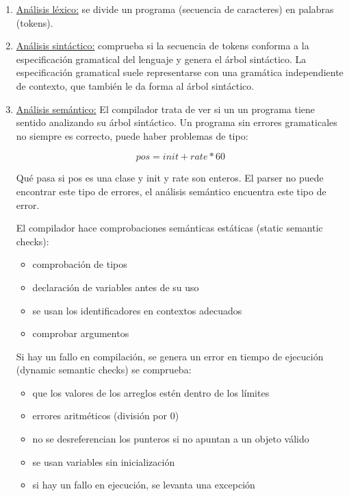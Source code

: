 \documentclass[10pt,a4paper]{report}
\begin{document}
\begin{enumerate}
	\item \underline{Análisis léxico:} se divide un programa (secuencia de caracteres) en 
	palabras (tokens).
	
	\item \underline{Análisis sintáctico:} comprueba si la secuencia de tokens conforma 
	a la especificación gramatical del lenguaje y genera el árbol sintáctico. La 
	especificación gramatical suele representarse con una gramática 
	independiente de contexto, que también le da forma al árbol sintáctico.
	
	\item \underline{Análisis semántico:} El compilador trata de ver si un un programa 
	tiene sentido analizando su árbol sintáctico. Un programa sin errores 
	gramaticales no siempre es correcto, puede haber problemas de tipo:

  	\begin{equation}
  		pos =  init + rate * 60
  	\end{equation}
	
		\par Qué pasa si pos es una clase y init y rate son enteros. El parser 
		no puede encontrar este tipo de errores, el análisis semántico 
		encuentra este tipo de error.

		\par El compilador hace comprobaciones semánticas estáticas (static 
		semantic checks): 
		\begin{itemize}
			\item comprobación de tipos
			\item declaración de variables antes de su uso
			\item se usan los identificadores en contextos adecuados 
			\item comprobar argumentos
		\end{itemize}

		\par Si hay un fallo en compilación, se genera un error en tiempo de 
		ejecución (dynamic semantic checks) se comprueba:
		\begin{itemize}
		\item que los valores de los arreglos estén dentro de los límites
		\item errores aritméticos (división por 0)
		\item no se desreferencian los punteros si no apuntan a un objeto 
		válido 
		\item se usan variables sin inicialización
		\item si hay un fallo en ejecución, se levanta una excepción
		\end{itemize}
		

\end{enumerate}
\end{document}
